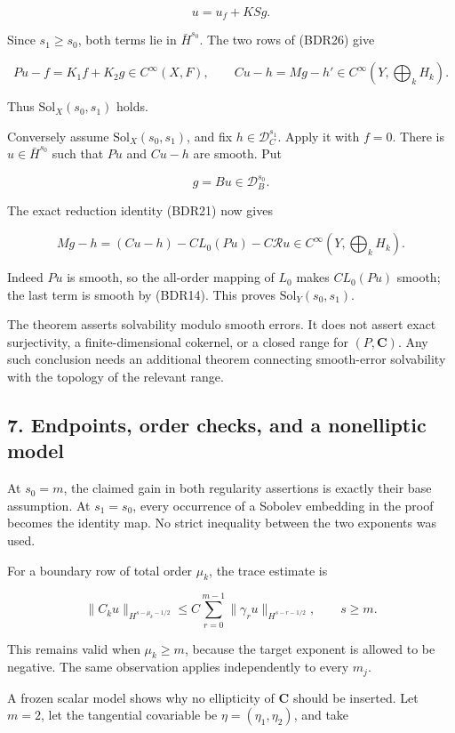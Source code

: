 \documentclass[
  11pt,
]{article}
\begin{document}
\[
 u=u_f+KSg.
 \tag{BDR43}
\]

Since \(s_1\geq s_0\), both terms lie in \(\bar H^{s_0}\). The two rows
of (BDR26) give

\[
 Pu-f=K_1f+K_2g\in C^\infty(X,F),\qquad
 Cu-h=Mg-h'\in C^\infty(Y,\textstyle\bigoplus_kH_k).
 \tag{BDR44}
\]

Thus \(\mathrm{Sol}_X(s_0,s_1)\) holds.

Conversely assume \(\mathrm{Sol}_X(s_0,s_1)\), and fix
\(h\in\mathcal D_C^{s_1}\). Apply it with \(f=0\). There is
\(u\in\bar H^{s_0}\) such that \(Pu\) and \(Cu-h\) are smooth. Put

\[
 g=Bu\in\mathcal D_B^{s_0}.
 \tag{BDR45}
\]

The exact reduction identity (BDR21) now gives

\[
 Mg-h=(Cu-h)-CL_0(Pu)-C\mathcal Ru
 \in C^\infty(Y,\textstyle\bigoplus_kH_k).
 \tag{BDR46}
\]

Indeed \(Pu\) is smooth, so the all-order mapping of \(L_0\) makes
\(CL_0(Pu)\) smooth; the last term is smooth by (BDR14). This proves
\(\mathrm{Sol}_Y(s_0,s_1)\).

The theorem asserts solvability modulo smooth errors. It does not assert
exact surjectivity, a finite-dimensional cokernel, or a closed range for
\((P,\mathbf C)\). Any such conclusion needs an additional theorem
connecting smooth-error solvability with the topology of the relevant
range.

\subsection{7. Endpoints, order checks, and a nonelliptic
model}\label{endpoints-order-checks-and-a-nonelliptic-model}

At \(s_0=m\), the claimed gain in both regularity assertions is exactly
their base assumption. At \(s_1=s_0\), every occurrence of a Sobolev
embedding in the proof becomes the identity map. No strict inequality
between the two exponents was used.

For a boundary row of total order \(\mu_k\), the trace estimate is

\[
 \|C_ku\|_{H^{s-\mu_k-1/2}}
 \leq C\sum_{r=0}^{m-1}
       \|\gamma_ru\|_{H^{s-r-1/2}},
 \qquad s\geq m.
 \tag{BDR47}
\]

This remains valid when \(\mu_k\geq m\), because the target exponent is
allowed to be negative. The same observation applies independently to
every \(m_j\).

A frozen scalar model shows why no ellipticity of \(\mathbf C\) should
be inserted. Let \(m=2\), let the tangential covariable be
\(\eta=(\eta_1,\eta_2)\), and take
\end{document}
